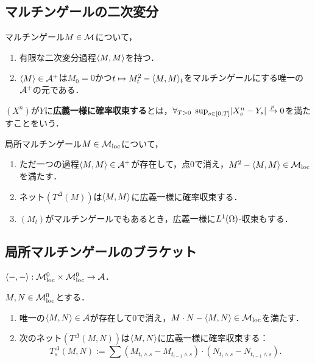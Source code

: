\documentclass[uplatex,dvipdfmx]{jsreport}
\begin{document}
\subsection{マルチンゲールの二次変分}

\begin{theorem}\mbox{}
    マルチンゲール$M\in\mathcal{M}$について，
    \begin{enumerate}
        \item 有限な二次変分過程$\langle M,M\rangle$を持つ．
        \item $\langle M\rangle\in\mathcal{A}^+$は$M_0=0$かつ$t\mapsto M_t^2-\langle M,M\rangle_t$をマルチンゲールにする唯一の$\mathcal{A}^+$の元である．
    \end{enumerate}
\end{theorem}

\begin{definition}
    $(X^n)$が$Y$に\textbf{広義一様に確率収束する}とは，$\forall_{T>0}\;\sup_{s\in[0,T]}\lvert X^n_s-Y_s\rvert\xrightarrow{p}0$を満たすことをいう．
\end{definition}

\begin{theorem}\label{thm-quadratic-variation-of-martingales}
    局所マルチンゲール$M\in\mathcal{M}_{\mathrm{loc}}$について，
    \begin{enumerate}
        \item ただ一つの過程$\langle M,M\rangle\in\mathcal{A}^+$が存在して，点$0$で消え，$M^2-\langle M,M\rangle\in\mathcal{M}_{\mathrm{loc}}$を満たす．
        \item ネット$(T^\Delta(M))$は$\langle M,M\rangle$に広義一様に確率収束する．
        \item $(M_t)$がマルチンゲールでもあるとき，広義一様に$L^1(\Omega)$-収束もする．
    \end{enumerate}
\end{theorem}

\subsection{局所マルチンゲールのブラケット}

\begin{tcolorbox}[colframe=ForestGreen, colback=ForestGreen!10!white,breakable,colbacktitle=ForestGreen!40!white,coltitle=black,fonttitle=\bfseries\sffamily,
title=]
    $\langle-,-\rangle:\mathcal{M}^0_{\mathrm{loc}}\times\mathcal{M}^0_{\mathrm{loc}}\to\mathcal{A}$．
\end{tcolorbox}

\begin{theorem}
    $M,N\in\mathcal{M}^0_{\mathrm{loc}}$とする．
    \begin{enumerate}
        \item 唯一の$\langle M,N\rangle\in\mathcal{A}$が存在して$0$で消え，$M\cdot N-\langle M,N\rangle\in\mathcal{M}_{\mathrm{loc}}$を満たす．
        \item 次のネット$(T^\Delta(M,N))$は$\langle M,N\rangle$に広義一様に確率収束する：
        \[T^\Delta_s(M,N):=\sum(M_{t_i\land s}-M_{t_{i-1}\land s})\cdot(N_{t_i\land s}-N_{t_{i-1}\land s}).\]
    \end{enumerate}
\end{theorem}
\end{document}
